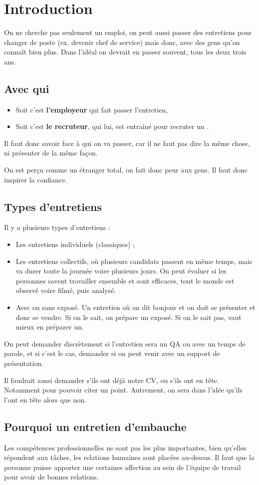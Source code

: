 \section{Introduction}
On ne cherche pas seulement un emploi, on peut aussi passer des entretiens pour changer de poste (ex. devenir chef de service) mais donc, avec des gens qu'on connaît bien plus. Dans l'idéal on devrait en passer souvent, tous les deux trois ans.

\subsection{Avec qui}
\begin{itemize}
    \item Soit c'est \textbf{l'employeur} qui fait passer l'entretien,
    \item Soit c'est \textbf{le recruteur}, qui lui, est entraîné pour recruter un .
\end{itemize}

Il faut donc savoir face à qui on va passer, car il ne faut pas dire la même chose, ni présenter de la même façon.

On est perçu comme un étranger total, on fait donc peur aux gens. Il faut donc inspirer la confiance.

\subsection{Types d'entretiens}
Il y a plusieurs types d'entretiens :
\begin{itemize}
    \item Les entretiens individuels (classiques) ;
    \item Les entretiens collectifs, où plusieurs candidats passent en même temps, mais va durer toute la journée voire plusieurs jours. On peut évaluer si les personnes savent travailler ensemble et sont efficaces, tout le monde est observé voire filmé, puis analysé.
    \item Avec ou sans exposé. Un entretien où on dit bonjour et on doit se présenter et donc se vendre. Si on le sait, on prépare un exposé. Si on le sait pas, vaut mieux en préparer un.
\end{itemize}

On peut demander discrètement si l'entretien sera un QA ou avec un temps de parole, et si c'est le cas, demander si on peut venir avec un support de présentation.

Il faudrait aussi demander s'ils ont déjà notre CV, ou s'ils ont en tête. Notamment pour pouvoir citer un point. Autrement, on sera dans l'idée qu'ils l'ont en tête alors que non.

\subsection{Pourquoi un entretien d'embauche}
Les compétences professionnelles ne sont pas les plus importantes, bien qu'elles répondent aux tâches, les relations humaines sont placées au-dessus. Il faut que la personne puisse apporter une certaines affection au sein de l'équipe de travail pour avoir de bonnes relations.
